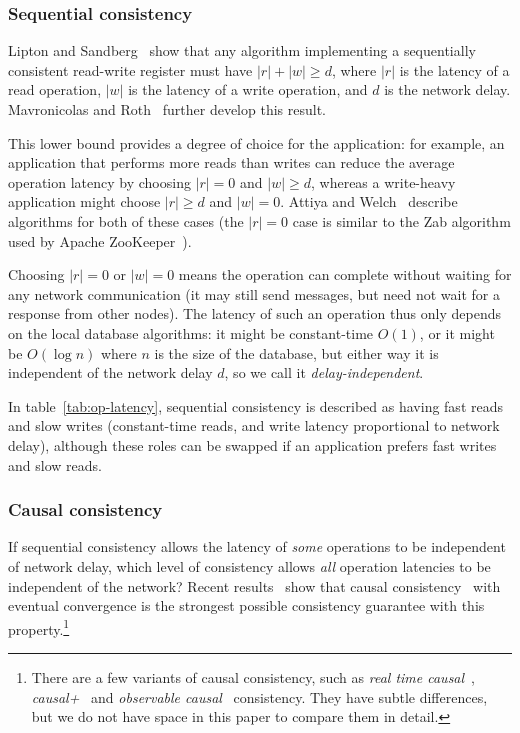 \documentclass[a4paper,twocolumn,10pt]{article}
\begin{document}
\subsubsection{Sequential consistency}

Lipton and Sandberg~\cite{Lipton1988uh} show that any algorithm implementing a sequentially
consistent read-write register must have $|r| + |w| \geq d$, where $|r|$ is the latency of a read
operation, $|w|$ is the latency of a write operation, and $d$ is the network delay. Mavronicolas
and Roth~\cite{Mavronicolas1999eb} further develop this result.

This lower bound provides a degree of choice for the application: for example, an application that
performs more reads than writes can reduce the average operation latency by choosing $|r| = 0$ and
$|w| \geq d$, whereas a write-heavy application might choose $|r| \geq d$ and $|w| = 0$. Attiya and
Welch~\cite{Attiya1994gw} describe algorithms for both of these cases (the $|r| = 0$ case is similar
to the Zab algorithm used by Apache ZooKeeper~\cite{Junqueira2011jc}).

Choosing $|r| = 0$ or $|w| = 0$ means the operation can complete without waiting for any network
communication (it may still send messages, but need not wait for a response from other nodes). The
latency of such an operation thus only depends on the local database algorithms: it might be
constant-time $O(1)$, or it might be $O(\log n)$ where $n$ is the size of the database, but either
way it is independent of the network delay $d$, so we call it \emph{delay-independent}.

In table~\ref{tab:op-latency}, sequential consistency is described as having fast reads and slow
writes (constant-time reads, and write latency proportional to network delay), although these roles
can be swapped if an application prefers fast writes and slow reads.

\subsubsection{Causal consistency}

If sequential consistency allows the latency of \emph{some} operations to be independent of network
delay, which level of consistency allows \emph{all} operation latencies to be independent of the
network? Recent results~\cite{Attiya2015dm, Mahajan2011wz} show that causal
consistency~\cite{Ahamad1995gl} with eventual convergence is the strongest possible consistency
guarantee with this property.\footnote{There are a few variants of causal consistency, such as
\emph{real time causal}~\cite{Mahajan2011wz}, \emph{causal+}~\cite{Lloyd2011hz} and
\emph{observable causal}~\cite{Attiya2015dm} consistency. They have subtle differences, but we do
not have space in this paper to compare them in detail.}
\end{document}

